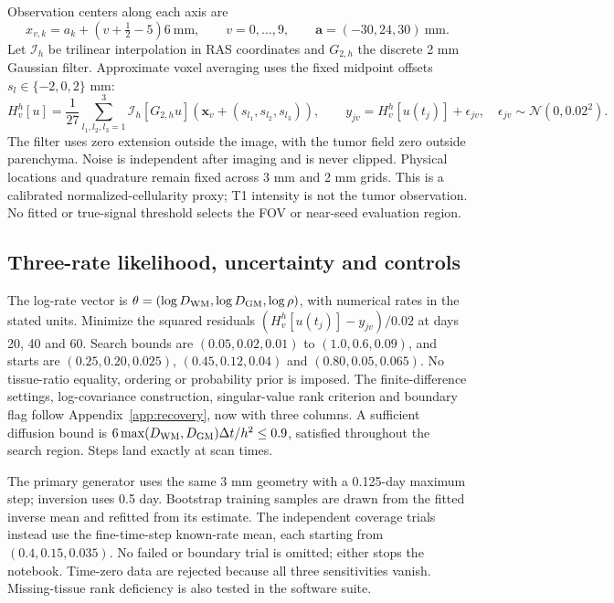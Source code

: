 Observation centers along each axis are
\begin{equation}
 x_{v,k}=a_k+(v+\tfrac12-5)6\ \mathrm{mm},\qquad v=0,\ldots,9,\qquad \bm a=(-30,24,30)\ \mathrm{mm}.
\end{equation}
Let $\mathcal I_h$ be trilinear interpolation in RAS coordinates and $G_{2,h}$ the discrete 2 mm Gaussian filter. Approximate voxel averaging uses the fixed midpoint offsets $s_l\in\{-2,0,2\}$ mm:
\begin{equation}
 H_v^h[u]=\frac1{27}\sum_{l_1,l_2,l_3=1}^3
 \mathcal I_h[G_{2,h}u](\bm x_v+(s_{l_1},s_{l_2},s_{l_3})),\qquad
 y_{jv}=H_v^h[u(t_j)]+\epsilon_{jv},\quad\epsilon_{jv}\sim\mathcal N(0,0.02^2).
\end{equation}
The filter uses zero extension outside the image, with the tumor field zero outside parenchyma. Noise is independent after imaging and is never clipped. Physical locations and quadrature remain fixed across 3 mm and 2 mm grids. This is a calibrated normalized-cellularity proxy; T1 intensity is not the tumor observation. No fitted or true-signal threshold selects the FOV or near-seed evaluation region.

\subsection{Three-rate likelihood, uncertainty and controls}
The log-rate vector is $\theta=(\log D_{\rm WM},\log D_{\rm GM},\log\rho)$, with numerical rates in the stated units. Minimize the squared residuals $(H_v^h[u(t_j)]-y_{jv})/0.02$ at days 20, 40 and 60. Search bounds are $(0.05,0.02,0.01)$ to $(1.0,0.6,0.09)$, and starts are $(0.25,0.20,0.025)$, $(0.45,0.12,0.04)$ and $(0.80,0.05,0.065)$. No tissue-ratio equality, ordering or probability prior is imposed. The finite-difference settings, log-covariance construction, singular-value rank criterion and boundary flag follow Appendix~\ref{app:recovery}, now with three columns. A sufficient diffusion bound is $6\max(D_{\rm WM},D_{\rm GM})\Delta t/h^2\leq0.9$, satisfied throughout the search region. Steps land exactly at scan times.

The primary generator uses the same 3 mm geometry with a 0.125-day maximum step; inversion uses 0.5 day. Bootstrap training samples are drawn from the fitted inverse mean and refitted from its estimate. The \BWTrials{} independent coverage trials instead use the fine-time-step known-rate mean, each starting from $(0.4,0.15,0.035)$. No failed or boundary trial is omitted; either stops the notebook. Time-zero data are rejected because all three sensitivities vanish. Missing-tissue rank deficiency is also tested in the software suite.

